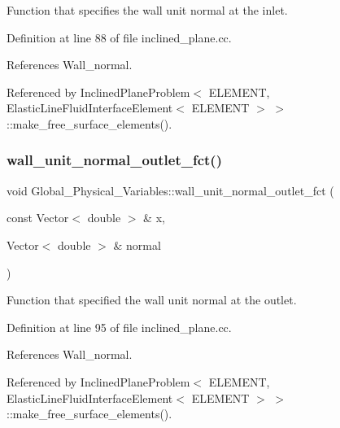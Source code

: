 Function that specifies the wall unit normal at the inlet. 



Definition at line 88 of file inclined\+\_\+plane.\+cc.



References Wall\+\_\+normal.



Referenced by Inclined\+Plane\+Problem$<$ E\+L\+E\+M\+E\+N\+T, Elastic\+Line\+Fluid\+Interface\+Element$<$ E\+L\+E\+M\+E\+N\+T $>$ $>$\+::make\+\_\+free\+\_\+surface\+\_\+elements().

\mbox{\label{namespaceGlobal__Physical__Variables_a8ab8f6e823e4cd204ed7264121a42bfb}} 
\subsubsection{\texorpdfstring{wall\+\_\+unit\+\_\+normal\+\_\+outlet\+\_\+fct()}{wall\_unit\_normal\_outlet\_fct()}}
{\footnotesize\ttfamily void Global\+\_\+\+Physical\+\_\+\+Variables\+::wall\+\_\+unit\+\_\+normal\+\_\+outlet\+\_\+fct (\begin{DoxyParamCaption}\item[{const Vector$<$ double $>$ \&}]{x,  }\item[{Vector$<$ double $>$ \&}]{normal }\end{DoxyParamCaption})}



Function that specified the wall unit normal at the outlet. 



Definition at line 95 of file inclined\+\_\+plane.\+cc.



References Wall\+\_\+normal.



Referenced by Inclined\+Plane\+Problem$<$ E\+L\+E\+M\+E\+N\+T, Elastic\+Line\+Fluid\+Interface\+Element$<$ E\+L\+E\+M\+E\+N\+T $>$ $>$\+::make\+\_\+free\+\_\+surface\+\_\+elements().



